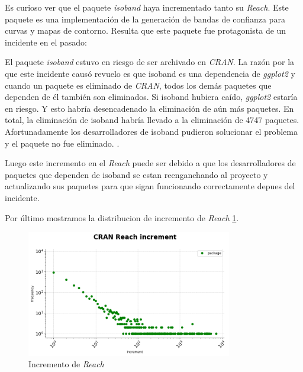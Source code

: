 Es curioso ver que el paquete \textit{isoband} haya incrementado tanto su \textit{Reach}.
Este paquete es una implementación de la generación de bandas de confianza para curvas y mapas de contorno.
Resulta que este paquete fue protagonista de un incidente en el pasado:

El paquete \textit{isoband} estuvo en riesgo de ser archivado en \textit{CRAN}. La razón por la que este incidente causó
revuelo es que isoband es una dependencia de \textit{ggplot2} y cuando un paquete es eliminado de \textit{CRAN}, todos los
demás paquetes que dependen de él también son eliminados. Si isoband hubiera caído, \textit{ggplot2} estaría en
riesgo. Y esto habría desencadenado la eliminación de aún más paquetes. En total, la eliminación de
isoband habría llevado a la eliminación de 4747 paquetes\cite{r-bloggers_isoband_incident}.
Afortunadamente los desarrolladores de isoband pudieron solucionar el problema y el paquete no fue eliminado.
\cite{isoband_issue}.

Luego este incremento en el \textit{Reach} puede ser debido a que los desarrolladores de paquetes que dependen de isoband
se estan reenganchando al proyecto y actualizando sus paquetes para que sigan funcionando correctamente depues del incidente.



Por último mostramos la distribucion de incremento de \textit{Reach} \ref{fig:Incremento de Reach}.

\begin{figure}[ht!]
    \begin{center}
        \includegraphics[width=0.8\textwidth]{img/cran/reach_increment.png}
        \caption{Incremento de \textit{Reach}}
        \label{fig:Incremento de Reach}
    \end{center}
\end{figure}


\newpage

